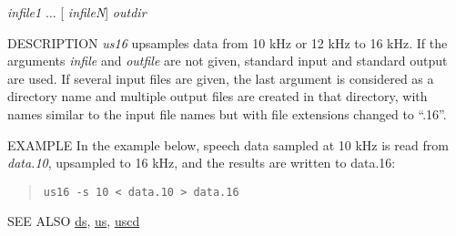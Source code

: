\begin{synopsis}
\item [us16] [ --s $S$ ] [ {\em infile} ] [ {\em outfile} ]
\item [us16] [ --s $S$ ] {\em infile1} $\dots$ [ {\em infileN}] {\em outdir} 
\end{synopsis}

\begin{qsection}{DESCRIPTION}
{\em us16} upsamples data from 10 kHz or 12 kHz to 16 kHz.
If the arguments {\em infile} and {\em outfile} are not given,
standard input and standard output are used.
If several input files are given,
the last argument is considered as a directory name
and multiple output files are created in that directory,
with names similar to the input file names
but with file extensions changed to ``.16''.
\end{qsection}

\begin{options}
\end{options}

\begin{qsection}{EXAMPLE}
In the example below, speech data sampled at 10 kHz
is read from {\em data.10}, upsampled to 16 kHz,
and the results are written to {data.16}:
\begin{quote}
\verb!us16 -s 10 < data.10 > data.16!
\end{quote}
\end{qsection}


\begin{qsection}{SEE ALSO}
 \hyperlink{ds}{ds},
 \hyperlink{us}{us},
 \hyperlink{uscd}{uscd}
\end{qsection}
